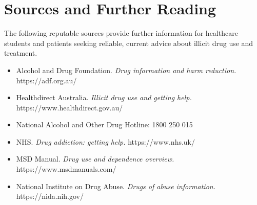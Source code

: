 \section*{Sources and Further Reading}
The following reputable sources provide further information for healthcare students and patients seeking reliable, current advice about illicit drug use and treatment.
\begin{itemize}
    \item Alcohol and Drug Foundation. \textit{Drug information and harm reduction.} https://adf.org.au/
    \item Healthdirect Australia. \textit{Illicit drug use and getting help.} https://www.healthdirect.gov.au/
    \item National Alcohol and Other Drug Hotline: 1800 250 015
    \item NHS. \textit{Drug addiction: getting help.} https://www.nhs.uk/
    \item MSD Manual. \textit{Drug use and dependence overview.} https://www.msdmanuals.com/
    \item National Institute on Drug Abuse. \textit{Drugs of abuse information.} https://nida.nih.gov/
\end{itemize}
